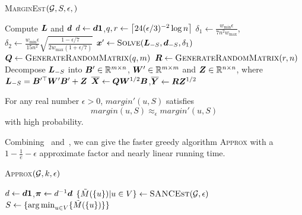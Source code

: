 \documentclass[sigconf]{acmart}
\begin{document}
\begin{algorithm}
    \caption{\textsc{MarginEst}\((\mathcal{G},S,\epsilon,)\)}
    \label{algo:marginest}
    Compute \(\boldsymbol{L}\) and \(\boldsymbol{d}\)\;
    \(d\gets\boldsymbol{d}\boldsymbol{1}\),\(q,r\gets\left\lceil24(\epsilon/3)^{-2}\log n\right\rceil\)\;
    \(\delta_1\gets \frac{w_{\min}\epsilon}{7n^2w_{\max}}\),\(\delta_2\gets \frac{w_{\min}\epsilon}{15n^2}\sqrt{\frac{1-\epsilon/7}{2w_{\max}(1+\epsilon/7)}}\)\;
    \(\boldsymbol{x}'\gets\textsc{Solve}(\boldsymbol{L}_{-S},\boldsymbol{d}_{-S},\delta_1)\)\;
    \(\boldsymbol{Q}\gets\textsc{GenerateRandomMatrix}(q,m)\)\;
    \(\boldsymbol{R}\gets\textsc{GenerateRandomMatrix}(r,n)\)\;
    Decompose \(\boldsymbol{L}_{-S}\) into \(\boldsymbol{B}'\in\mathbb{R}^{m\times n}\), \(\boldsymbol{W}'\in\mathbb{R}^{m\times m}\) and \(\boldsymbol{Z}\in\mathbb{R}^{n\times n}\), where \(\boldsymbol{L}_{-S}=\boldsymbol{B}'^\top\boldsymbol{W}'\boldsymbol{B}'+\boldsymbol{Z}\)\;
    \(\overline{\boldsymbol{X}}\gets\boldsymbol{Q}\boldsymbol{W}^{1/2}\boldsymbol{B}\),\(\overline{\boldsymbol{Y}}\gets\boldsymbol{R}\boldsymbol{Z}^{1/2}\)\;

\end{algorithm}

\begin{theorem}\label{thm:approx-marginest}
    For any real number \(\epsilon>0\), \(margin'(u,S)\) satisfies
    \[margin(u,S)\approx_\epsilon margin'(u,S)\]
    with high probability.
\end{theorem}


Combining~ and~, we can give the faster greedy algorithm \textsc{Approx} with a \(1-\frac1e-\epsilon\) approximate factor and nearly linear running time.

\begin{algorithm}
    \caption{\textsc{Approx}\((\mathcal{G},k,\epsilon)\)}
    \label{algo:approx}
    \(d\gets\boldsymbol{d}\boldsymbol{1}\),\(\boldsymbol{\pi}\gets d^{-1}\boldsymbol{d}\)\;
    \(\{\tilde{M}(\{u\})|u\in V \}\gets\textsc{SANCEst}(\mathcal{G},\epsilon)\)\;
    \(S\gets\{\operatorname*{arg\,min}_{u\in V}\{\tilde{M}(\{u\}) \} \}\)\;
\end{algorithm}
\end{document}
